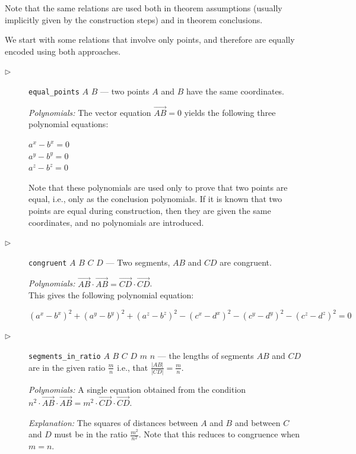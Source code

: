 \documentclass[final,1p,times,authoryear]{elsarticle}
\begin{document}
Note that the same relations are used both in theorem assumptions
(usually implicitly given by the construction steps) and in theorem
conclusions.

We start with some relations that involve only points, and therefore
are equally encoded using both approaches.

\begin{description}
\item[$\triangleright$] {\tt equal\_points} $A$ $B$ --- two points $A$
  and $B$ have the same coordinates.

  {\em Polynomials:} The vector equation $\overrightarrow{AB} = 0$
  yields the following three polynomial equations:
  \begin{tabbing}
    $a^x - b^x = 0$\\
    $a^y - b^y = 0$\\
    $a^z - b^z = 0$
  \end{tabbing}

  Note that these polynomials are used only to prove that two points
  are equal, i.e., only as the conclusion polynomials. If it is known
  that two points are equal during construction, then they are given
  the same coordinates, and no polynomials are introduced.

\item[$\triangleright$] {\tt congruent} $A$ $B$ $C$ $D$ --- Two
  segments, $AB$ and $CD$ are congruent.


{\em Polynomials:}
$\overrightarrow{AB} \cdot \overrightarrow{AB} = \overrightarrow{CD} \cdot \overrightarrow{CD}$. \\
This gives the following polynomial equation:

$$({a^x} - {b^x})^2 + ({a^y} - {b^y})^2 + ({a^z} - {b^z})^2 - ({c^x} - {d^x})^2 - ({c^y} - {d^y})^2 - ({c^z} - {d^z})^2 = 0$$

\item[$\triangleright$] {\tt segments\_in\_ratio} $A$ $B$ $C$ $D$
  $m$ $n$ --- the lengths of segments $AB$ and
  $CD$ are in the given ratio $\frac{m}{n}$ i.e., that
  $\frac{|AB|}{|CD|} = \frac{m}{n}$.

{\em Polynomials:} A single equation obtained from the condition
$n^2 \cdot \overrightarrow{AB} \cdot \overrightarrow{AB} = m^2 \cdot \overrightarrow{CD} \cdot \overrightarrow{CD}$.

{\em Explanation:} The squares of distances between $A$ and $B$ and
between $C$ and $D$ must be in the ratio $\frac{m^2}{n^2}$. Note that
this reduces to congruence when $m = n$.


\end{description}
\end{document}
